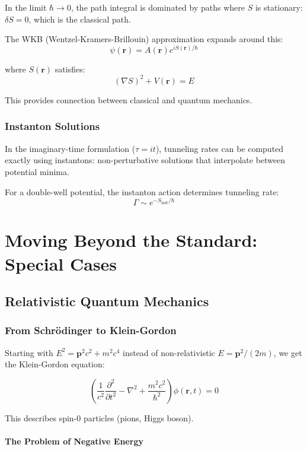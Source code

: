 \documentclass[12pt,openany,oneside]{book}
\begin{document}
{{{In the limit $\hbar \to 0$, the path integral is dominated by paths where $S$ is stationary: $\delta S = 0$, which is the classical path.

The WKB (Wentzel-Kramers-Brillouin) approximation expands around this:
\[
\psi(\mathbf{r}) = A(\mathbf{r})e^{iS(\mathbf{r})/\hbar}
\]

where $S(\mathbf{r})$ satisfies:
\[
(\nabla S)^2 + V(\mathbf{r}) = E
\]

This provides connection between classical and quantum mechanics.

\section{Instanton Solutions}

In the imaginary-time formulation ($\tau = it$), tunneling rates can be computed exactly using instantons: non-perturbative solutions that interpolate between potential minima.

For a double-well potential, the instanton action determines tunneling rate:
\[
\Gamma \sim e^{-S_{\text{inst}}/\hbar}
\]

\part{Moving Beyond the Standard: Special Cases}

\chapter{Relativistic Quantum Mechanics}

\section{From Schrödinger to Klein-Gordon}

Starting with $E^2 = \mathbf{p}^2c^2 + m^2c^4$ instead of non-relativistic $E = \mathbf{p}^2/(2m)$, we get the Klein-Gordon equation:

\[
\left(\frac{1}{c^2}\frac{\partial^2}{\partial t^2} - \nabla^2 + \frac{m^2c^2}{\hbar^2}\right)\phi(\mathbf{r},t) = 0
\]

This describes spin-0 particles (pions, Higgs boson).

\subsection{The Problem of Negative Energy}

}}}
\end{document}
